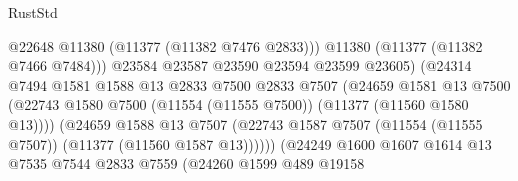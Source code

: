 \begin{lexlean}{RustStd}
\begin{coremodule}
                                              @22648
                                              @11380
                                              (@11377 (@11382 @7476 @2833)))
                                            @11380
                                            (@11377 (@11382 @7466 @7484)))
                                          @23584
                                          @23587
                                          @23590
                                          @23594
                                          @23599
                                          @23605)
                                        (@24314
                                          @7494
                                          @1581
                                          @1588
                                          @13
                                          @2833
                                          @7500
                                          @2833
                                          @7507
                                          (@24659
                                            @1581
                                            @13
                                            @7500
                                            (@22743
                                              @1580
                                              @7500
                                              (@11554 (@11555 @7500))
                                              (@11377 (@11560 @1580 @13))))
                                          (@24659
                                            @1588
                                            @13
                                            @7507
                                            (@22743
                                              @1587
                                              @7507
                                              (@11554 (@11555 @7507))
                                              (@11377 (@11560 @1587 @13))))))
                                      (@24249
                                        @1600
                                        @1607
                                        @1614
                                        @13
                                        @7535
                                        @7544
                                        @2833
                                        @7559
                                        (@24260
                                          @1599
                                          @489
                                          @19158

\end{coremodule}
\end{lexlean}
